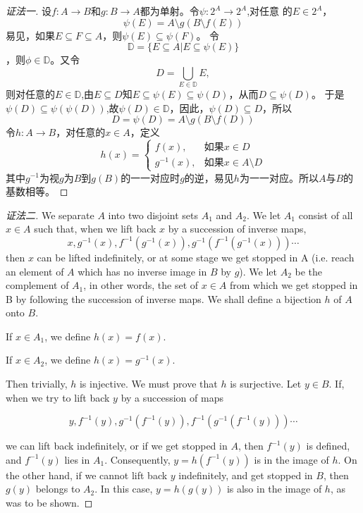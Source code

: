 \documentclass{book}[oneside]
\begin{document}
\begin{CJK*}{UTF8}{gbsn}
  \begin{proof}[证法一]
    设$f:A\to B$和$g:B\to A$都为单射。令$\psi:2^A\to 2^A$,对任意
    的$E\in 2^A$，\[\psi(E)=A\setminus g(B\setminus f(E))\]易见，如果$E\subseteq F\subseteq A$，则$\psi(E)\subseteq \psi(F)$。
    令\[\mathbb{D}=\{E\subseteq A|E\subseteq \psi(E)\}\]，则$\phi\in \mathbb{D}$。又令
    \[D=\bigcup_{E\in \mathbb{D}}E,\]
    则对任意的$E\in \mathbb{D}$,由$E\subseteq D$知$E\subseteq \psi(E) \subseteq \psi(D)$，从而$D\subseteq \psi(D)$。
    于是$\psi(D)\subseteq \psi(\psi(D))$,故$\psi(D)\in \mathbb{D}$，因此，$\psi(D)\subseteq D$，所以
    \[D=\psi(D)=A\setminus g(B\setminus f(D))\]
    令$h:A\to B$，对任意的$x\in A$，定义
    \[h(x)=\begin{cases}
        f(x),&\text{如果}x\in D\\
        g^{-1}(x),&\text{如果}x\in A\setminus D
      \end{cases}
    \]
    其中$g^{-1}$为视$g$为$B$到$g(B)$的一一对应时$g$的逆，易见$h$为一一对应。所以$A$与$B$的基数相等。
  \end{proof}

  \begin{proof}[证法二]
     We separate $A$ into two disjoint sets $A_1$ and $A_2$. We let $A_1$ consist of all $x\in A$ such that, when we lift back $x$ by a succession of inverse maps,
    \[x, g^{-1}(x), f^{-1}(g^{-1}(x)),g^{-1}(f^{-1}(g^{-1}(x)))\cdots\]
    then $x$ can be lifted indefinitely, or  at some stage we get stopped in A (i.e. reach an element of $A$ which has no inverse image in $B$ by $g$). We let $A_2$ be the complement of $A_1$, in other words, the set of $x\in A$ from which we get stopped in B by following the succession of inverse maps. We shall define a bijection $h$ of $A$ onto $B$.

    If $x\in A_1$, we define $h(x)=f(x)$.

    If $x\in A_2$, we define $h(x)=g^{-1}(x)$.

    Then trivially, $h$ is injective. We must prove that $h$ is surjective. Let $y\in B$. If, when we try to lift back $y$ by a succession of maps

    \[y, f^{-1}(y), g^{-1}(f^{-1}(y)),f^{-1}(g^{-1}(f^{-1}(y)))\cdots\]
    
    we can lift back indefinitely, or if we get stopped in $A$, then $f^{-1}(y)$ is defined, and $f^{-1}(y)$ lies in $A_1$. Consequently, $y = h(f^{-1}(y))$ is in the image of $h$. On the other hand, if we cannot lift back $y$ indefinitely, and get stopped in $B$, then $g(y)$ belongs to $A_2$. In this case, $y=h(g(y))$ is also in the image of $h$, as was to be shown.


\end{proof}
\end{CJK*}
\end{document}
